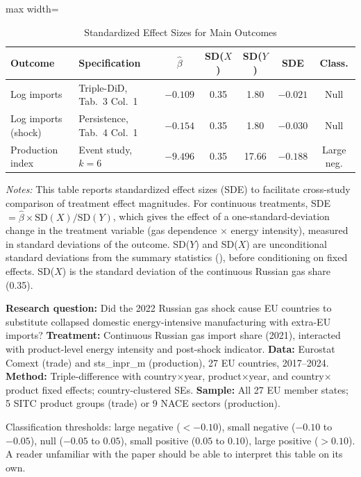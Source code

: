 \documentclass[12pt]{article}
\begin{document}
\begin{table}[H]
\centering
\caption{Standardized Effect Sizes for Main Outcomes}
\label{tab:sde}
\begin{adjustbox}{max width=\textwidth}
\begin{tabular}{llccccc}
\toprule
Outcome & Specification & $\hat{\beta}$ & SD($X$) & SD($Y$) & SDE & Class. \\
\midrule
Log imports & Triple-DiD, Tab.\ 3 Col.\ 1 & $-0.109$ & 0.35 & 1.80 & $-0.021$ & Null \\
Log imports (shock) & Persistence, Tab.\ 4 Col.\ 1 & $-0.154$ & 0.35 & 1.80 & $-0.030$ & Null \\
Production index & Event study, $k=6$ & $-9.496$ & 0.35 & 17.66 & $-0.188$ & Large neg. \\
\bottomrule
\end{tabular}
\end{adjustbox}
\par\vspace{0.3em}
{\footnotesize \emph{Notes:} This table reports standardized effect sizes (SDE)
to facilitate cross-study comparison of treatment effect magnitudes.
For continuous treatments, SDE $= \hat{\beta} \times \text{SD}(X) / \text{SD}(Y)$,
which gives the effect of a one-standard-deviation change in the treatment variable
(gas dependence $\times$ energy intensity),
measured in standard deviations of the outcome.
SD($Y$) and SD($X$) are unconditional standard deviations from the summary
statistics (), before conditioning on fixed effects.
SD($X$) is the standard deviation of the continuous Russian gas share (0.35).

\textbf{Research question:} Did the 2022 Russian gas shock cause EU countries to substitute collapsed domestic energy-intensive manufacturing with extra-EU imports?
\textbf{Treatment:} Continuous Russian gas import share (2021), interacted with product-level energy intensity and post-shock indicator.
\textbf{Data:} Eurostat Comext (trade) and sts\_inpr\_m (production), 27 EU countries, 2017--2024.
\textbf{Method:} Triple-difference with country$\times$year, product$\times$year, and country$\times$product fixed effects; country-clustered SEs.
\textbf{Sample:} All 27 EU member states; 5 SITC product groups (trade) or 9 NACE sectors (production).

Classification thresholds:
large negative ($< -0.10$), small negative ($-0.10$ to $-0.05$),
null ($-0.05$ to $0.05$), small positive ($0.05$ to $0.10$),
large positive ($> 0.10$).
A reader unfamiliar with the paper should be able to interpret this table
on its own.}
\end{table}
\end{document}
